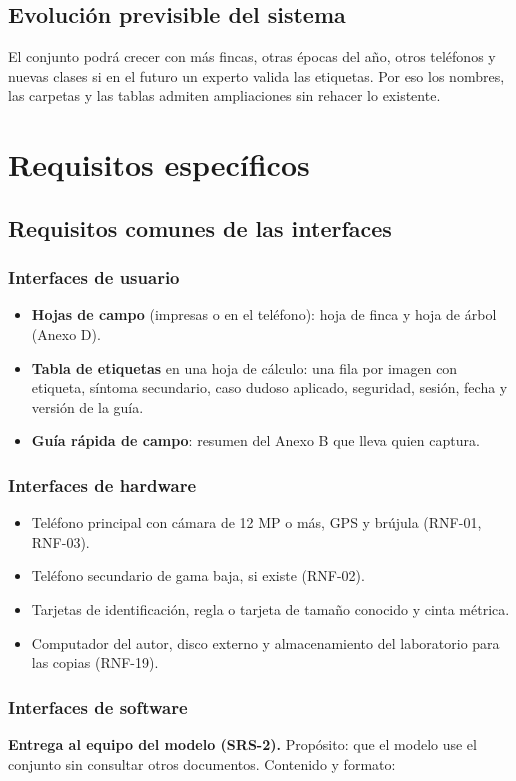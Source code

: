 \documentclass[11pt]{article}
\begin{document}
\subsection{Evolución previsible del sistema}
El conjunto podrá crecer con más fincas, otras épocas del año, otros teléfonos y nuevas clases si en el futuro un experto valida las etiquetas. Por eso los nombres, las carpetas y las tablas admiten ampliaciones sin rehacer lo existente.

\section{Requisitos específicos}
\subsection{Requisitos comunes de las interfaces}
\subsubsection{Interfaces de usuario}
\begin{itemize}[leftmargin=1.2em,itemsep=2pt,topsep=2pt]
\item \textbf{Hojas de campo} (impresas o en el teléfono): hoja de finca y hoja de árbol (Anexo D).
\item \textbf{Tabla de etiquetas} en una hoja de cálculo: una fila por imagen con etiqueta, síntoma secundario, caso dudoso aplicado, seguridad, sesión, fecha y versión de la guía.
\item \textbf{Guía rápida de campo}: resumen del Anexo B que lleva quien captura.
\end{itemize}
\subsubsection{Interfaces de hardware}
\begin{itemize}[leftmargin=1.2em,itemsep=2pt,topsep=2pt]
\item Teléfono principal con cámara de 12 MP o más, GPS y brújula (RNF-01, RNF-03).
\item Teléfono secundario de gama baja, si existe (RNF-02).
\item Tarjetas de identificación, regla o tarjeta de tamaño conocido y cinta métrica.
\item Computador del autor, disco externo y almacenamiento del laboratorio para las copias (RNF-19).
\end{itemize}
\subsubsection{Interfaces de software}
\textbf{Entrega al equipo del modelo (SRS-2).} Propósito: que el modelo use el conjunto sin consultar otros documentos. Contenido y formato:
\end{document}
